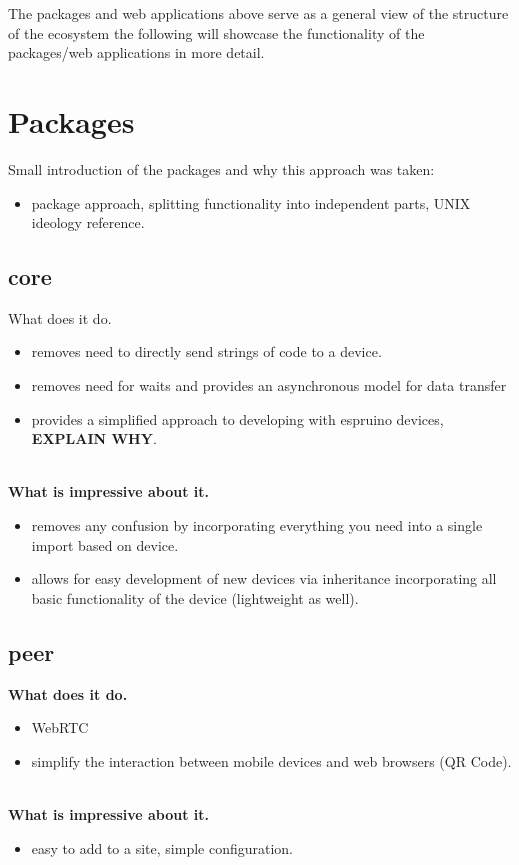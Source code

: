 \documentclass{l4proj}
\begin{document}
The packages and web applications above serve as a general view of the structure of the ecosystem the following will showcase the functionality of the packages/web applications in more detail.

\section{Packages}
Small introduction of the packages and why this approach was taken:

\begin{itemize}
    \item package approach, splitting functionality into independent parts, UNIX ideology reference.
\end{itemize}

\subsection{core}

\text What does it do.
\begin{itemize}
    \item removes need to directly send strings of code to a device.
    \item removes need for waits and provides an asynchronous model for data transfer
    \item provides a simplified approach to developing with espruino devices, \textbf{EXPLAIN WHY}.
\end{itemize}
\\
\textbf{What is impressive about it.}
\begin{itemize}
    \item removes any confusion by incorporating everything you need into a single import based on device.
    \item allows for easy development of new devices via inheritance incorporating all basic functionality of the device (lightweight as well).
\end{itemize}
\subsection{peer}

\textbf{What does it do.}
\begin{itemize}
    \item WebRTC
    \item simplify the interaction between mobile devices and web browsers (QR Code).
\end{itemize}
\\
\textbf{What is impressive about it.}
\begin{itemize}
    \item easy to add to a site, simple configuration.
\end{itemize}
\end{document}
